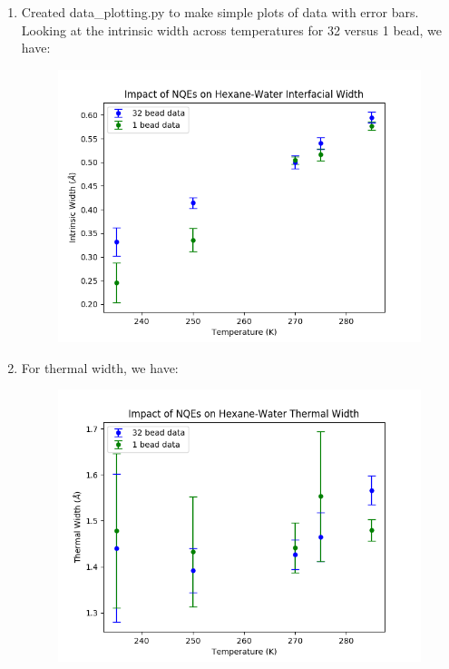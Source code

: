 \documentclass[12pt,reqno]{amsart}
\numberwithin{equation}{section}
\begin{document}
\begin{enumerate}
\item Created data\_plotting.py to make simple plots of data with error bars.  Looking at the intrinsic width across temperatures for 32 versus 1 bead, we have:

\begin{figure}[H]
\centering
\includegraphics[scale=0.6]{intrinsic-width-32bead-vs-1bead}
\end{figure}

\item For thermal width, we have:

\begin{figure}[H]
\centering
\includegraphics[scale=0.6]{thermal-width-32bead-vs-1bead}
\end{figure}


\end{enumerate}
\end{document}
